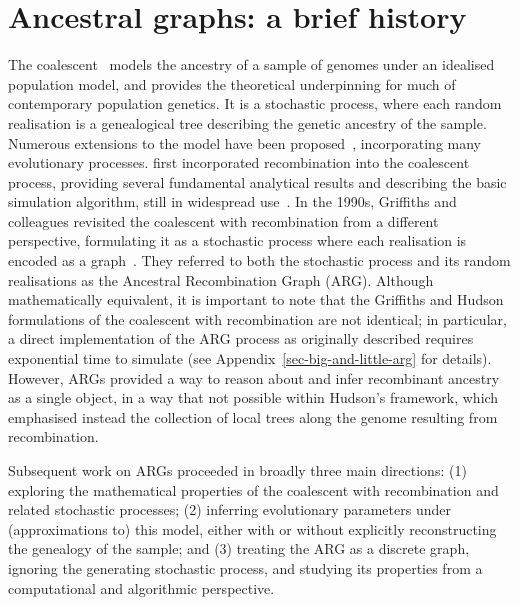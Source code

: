 \documentclass{article}
\begin{document}
\section{Ancestral graphs: a brief history}
\label{sec-arg-history}
The coalescent~\citep{kingman1982coalescent,kingman1982genealogy,
hudson1983testing, tajima1983evolutionary} models the ancestry of a sample of
genomes under an idealised population model, and provides the theoretical
underpinning for much of contemporary population genetics.
It is a stochastic process, where each random realisation
is a genealogical tree describing the genetic ancestry of the sample.
Numerous extensions to the model have been
proposed~\citep{hudson1990gene,hein2004gene,wakely2008coalescent},
incorporating many evolutionary processes.
\citet{hudson1983properties}
first incorporated recombination into the coalescent process,
providing several fundamental analytical results
and describing the basic simulation algorithm, still in
widespread use~\citep{hudson2002generating,kelleher2016efficient,
baumdicker2021efficient}.
In the 1990s, Griffiths and colleagues revisited the
coalescent with recombination from a different perspective,
formulating it as a stochastic process where each realisation
is encoded as a graph~\citep{griffiths1991two,ethier1990two,
griffiths1996ancestral,griffiths1997ancestral}.
They referred to both the stochastic process and
its random realisations as the Ancestral Recombination Graph (ARG).
Although mathematically equivalent, it is
important to note that the Griffiths and Hudson formulations of
the coalescent with recombination are not identical;
in particular, a direct implementation of the ARG process
as originally described requires exponential time to simulate
(see Appendix~\ref{sec-big-and-little-arg} for details).
However, ARGs provided a way
to reason about and infer recombinant ancestry as a single object,
in a way that not possible within Hudson's framework, which emphasised
instead the collection of local trees along the genome
resulting from recombination.

Subsequent work on ARGs proceeded in broadly three main directions:
(1) exploring the mathematical properties of the coalescent with recombination and
related stochastic processes;
(2) inferring evolutionary parameters under
(approximations to) this model, either with or without explicitly reconstructing the
genealogy of the sample;
and (3) treating the ARG as a discrete graph, ignoring the
generating stochastic process, and studying its properties from a computational and
algorithmic perspective.
\end{document}
